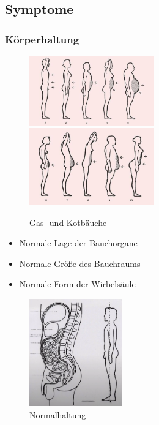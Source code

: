 \documentclass[xcolor=dvipsnames]{beamer}
\begin{document}
    \subsection{Symptome}
    \begin{frame}[allowframebreaks]
        \frametitle{Körperhaltung}

        \begin{figure}
            \includegraphics[width=5.4cm]{../images/gasbauch.jpg}\\
            \includegraphics[width=5.4cm]{../images/kotbauch.jpg}
            \caption{Gas- und Kotbäuche}
        \end{figure}

        \begin{itemize}
            \item Normale Lage der Bauchorgane
            \item Normale Größe des Bauchraums
            \item Normale Form der Wirbelsäule
        \end{itemize}

        \begin{figure}
            \includegraphics[width=4cm]{../images/normalhaltung.png}
            \caption{Normalhaltung}
        \end{figure}


\end{frame}
\end{document}
